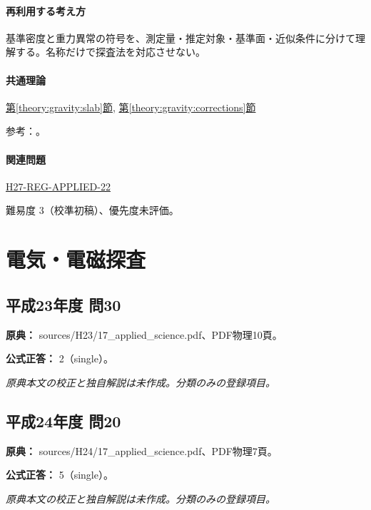 \paragraph{再利用する考え方} 基準密度と重力異常の符号を、測定量・推定対象・基準面・近似条件に分けて理解する。名称だけで探査法を対応させない。

\paragraph{共通理論} \hyperref[theory:gravity:slab]{第\ref*{theory:gravity:slab}節}, \hyperref[theory:gravity:corrections]{第\ref*{theory:gravity:corrections}節}

\par 参考：\cite{gsi_gravity_definitions}。

\paragraph{関連問題} \hyperref[q:h27-reg-applied-22]{H27-REG-APPLIED-22}

\par 難易度 3（校準初稿）、優先度未評価。

\section{電気・電磁探査}

\subsection{平成23年度 問30}
\label{q:h23-reg-applied-30}

\noindent\textbf{原典：} sources/H23/17\_applied\_science.pdf、PDF物理10頁。

\textbf{公式正答：} 2（single）。

\par\textit{原典本文の校正と独自解説は未作成。分類のみの登録項目。}

\subsection{平成24年度 問20}
\label{q:h24-reg-applied-20}

\noindent\textbf{原典：} sources/H24/17\_applied\_science.pdf、PDF物理7頁。

\textbf{公式正答：} 5（single）。

\par\textit{原典本文の校正と独自解説は未作成。分類のみの登録項目。}

